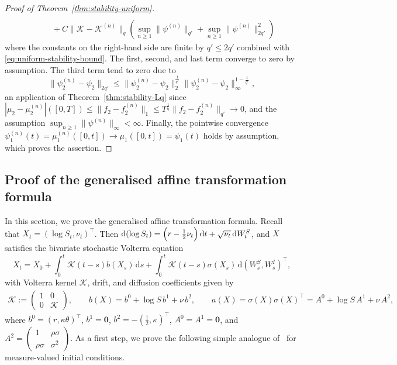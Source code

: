\documentclass[10pt,a4paper,reqno]{amsart}
\theoremstyle{plain}
\theoremstyle{definition}
\theoremstyle{remark}
\theoremstyle{example}
\begin{document}
\begin{proof}[Proof of Theorem~\ref{thm:stability-uniform}]
\begin{align*}
        \\ &\qquad + C \| \mathcal{K} - \mathcal{K}^{(n)}\|_q \left( \sup_{n \geq 1}\|\psi^{(n)}\|_{q'} + \sup_{n \geq 1}\| \psi^{(n)}\|_{2q'}^2 \right)
    \end{align*}
    where the constants on the right-hand side are finite by $q' \leq 2q'$ combined with \eqref{eq:uniform-stability-bound}. The first, second, and last term converge to zero by assumption. The third term tend to zero due to
    \[
        \| \psi_2^{(n)} - \psi_2\|_{2q'} \leq \| \psi_2^{(n)} - \psi_2\|_{2}^{\frac{1}{q'}} \| \psi_2^{(n)} - \psi_2\|_{\infty}^{1 - \frac{1}{q'}},
    \]
    an application of Theorem~\ref{thm:stability-Lq} since $|\mu_2 - \mu_2^{(n)}|([0,T]) \leq \| f_2 - f_2^{(n)}\|_1 \leq T^{\frac{1}{q}}\| f_2 - f_2^{(n)}\|_{q'} \longrightarrow 0$, and the assumption $\sup_{n \geq 1}\| \psi^{(n)}\|_{\infty} < \infty$. Finally, the pointwise convergence $\psi_1^{(n)}(t) = \mu^{(n)}_1([0,t]) \longrightarrow \mu_1([0,t]) = \psi_1(t)$ holds by assumption, which proves the assertion.
\end{proof}

\subsection{Proof of the generalised affine transformation formula}\label{sec:proof-affine-formula}

In this section, we prove the generalised affine transformation formula. Recall that $X_t = (\log S_t, \nu_t)^{\top}$. Then $\mathrm{d}(\log S_t) = \Bigl(r - \tfrac{1}{2}\nu_t\Bigr)\,\mathrm{d}t + \sqrt{\nu_t}\,\mathrm{d}W^S_t$, and $X$ satisfies the bivariate stochastic Volterra equation
\[
  X_t = X_0 + \int_0^t \bm{\mathcal{K}}(t-s)b(X_s)\,\mathrm{d}s
        + \int_0^t \bm{\mathcal{K}}(t-s)\sigma(X_s)\,\mathrm{d}(W^S_s,W^I_s)^\top,
\]
with Volterra kernel $\bm{\mathcal{K}}$, drift, and diffusion coefficients given by
\begin{align}\label{eq:vector}
  \bm{\mathcal{K}} := 
  \begin{pmatrix}
    1 & 0 \\
    0 & \mathcal{K}
  \end{pmatrix}, \qquad b(X) = b^0 + \log S\,b^1 + \nu\,b^2,
  \qquad 
  a(X) = \sigma(X)\sigma(X)^\top = A^0 + \log S\,A^1 + \nu\,A^2,
\end{align}
where $b^0 = (r, \kappa\theta)^{\top}$, $b^1 = \bm{0}$, $b^2 = - (\tfrac{1}{2}, \kappa)^{\top}$, $A^0=A^1=\bm{0}$, and $A^2 = \begin{pmatrix}
    1 & \rho\sigma \\
    \rho\sigma & \sigma^2
  \end{pmatrix}$.
As a first step, we prove the following simple analogue of~\cite[Thm.~4.3]{abi2019affine} for measure-valued initial conditions.
\end{document}
